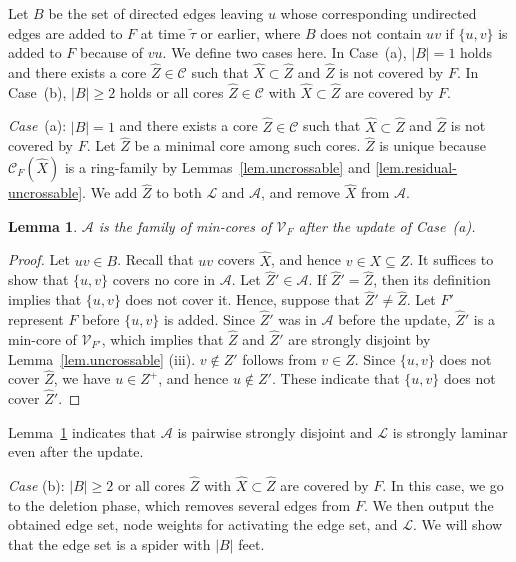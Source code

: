 \documentclass[11pt]{article}
\newtheorem{lemma}{Lemma}
\newcommand{\Afam}{\mathcal{A}}
\newcommand{\Cfam}{\mathcal{C}}
\newcommand{\Vfam}{\mathcal{V}}
\newcommand{\Lfam}{\mathcal{L}}
\begin{document}
Let $B$ be the set of directed edges leaving $u$ whose corresponding
undirected edges are added to $F$ at time $\tilde{\tau}$ or earlier, where
$B$ does not contain $uv$ if $\{u,v\}$ is added to $F$ because of $vu$.
We define two cases here.
In Case~(a),  $|B|=1$ holds 
and 
there exists a core $\hat{Z} \in \Cfam$ such that 
$\hat{X} \subset\hat{Z}$ and $\hat{Z}$ is not covered by $F$.
In Case~(b), $|B|\geq 2$ holds or 
all cores $\hat{Z} \in \Cfam$ with $\hat{X} \subset
\hat{Z}$ are covered by $F$.

{\em Case}~(a): $|B|=1$
and 
there exists a core $\hat{Z} \in \Cfam$ such that 
$\hat{X} \subset\hat{Z}$ and $\hat{Z}$ is not covered by $F$.
Let $\hat{Z}$ be a minimal core among such cores. $\hat{Z}$ is
unique because $\Cfam_F(\hat{X})$ is a ring-family by
Lemmas~\ref{lem.uncrossable} and \ref{lem.residual-uncrossable}.
We add $\hat{Z}$ to both $\Lfam$ and $\Afam$, and remove
$\hat{X}$ from $\Afam$.

\begin{lemma}\label{lem.afam}
  $\Afam$ is the family of min-cores of
 $\Vfam_F$
 after the update of Case~{\rm (}a\/{\rm )}.
\end{lemma}
\begin{proof}
 Let $uv \in B$.
 Recall that $uv$ covers $\hat{X}$, and hence $v \in X \subseteq Z$.
 It suffices to show that $\{u,v\}$ covers no core in $\Afam$.
 Let $\hat{Z}' \in \Afam$. If $\hat{Z}'=\hat{Z}$, then its definition
 implies that $\{u,v\}$ does not cover it.
 Hence, suppose that $\hat{Z}'\neq \hat{Z}$.
 Let $F'$ represent $F$ before $\{u,v\}$ is added.
 Since $\hat{Z}'$ was in $\Afam$ before the update,
 $\hat{Z}'$ is a min-core of  $\Vfam_{F'}$, which 
 implies that $\hat{Z}$ and $\hat{Z}'$ are strongly disjoint by
 Lemma~\ref{lem.uncrossable} (iii).
 $v \not\in Z'$ follows from $v \in Z$.
 Since 
 $\{u,v\}$ does not cover $\hat{Z}$, we have $u \in Z^+$, and 
 hence $u \not\in Z'$.
 These indicate that $\{u,v\}$ does not cover $\hat{Z}'$.
\end{proof}

Lemma~\ref{lem.afam} indicates that
$\Afam$ is pairwise strongly disjoint and $\Lfam$ is strongly laminar
even after the update. 


{\em Case} (b): $|B|\geq 2$ or 
all cores $\hat{Z}$ with $\hat{X} \subset
\hat{Z}$ are covered by $F$.
In this case, we go to the deletion phase, which
removes several edges from $F$.
We then output the obtained edge set, 
node weights for activating the edge set,
and $\Lfam$.
We will show that the edge set is a spider with $|B|$ feet.
\end{document}
